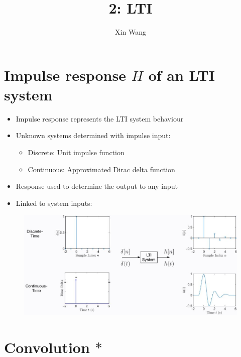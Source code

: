 \documentclass[conference]{IEEEtran}
\begin{document}
\title{2: LTI}
\author{Xin Wang}
\maketitle
\section{Impulse response $H$ of an LTI system}

\begin{itemize}
  \item Impulse response represents the LTI system behaviour
  \item Unknown systems determined with impulse input:
  \begin{itemize}
    \item Discrete: Unit impulse function 
    \item Continuous: Approximated Dirac delta function
  \end{itemize}
  \item Response used to determine the output to any input
  \item Linked to system inputs:
\end{itemize}
\begin{figure} [h!]
    \centering
    \includegraphics[scale=0.45]{1.JPG}
\end{figure}

\section{Convolution $*$}
\end{document}
